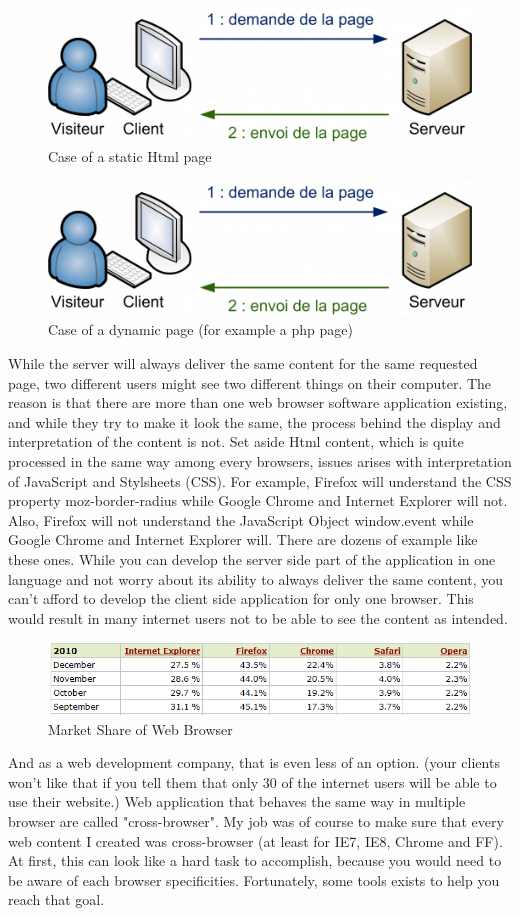 \begin{figure}[!l]
\centering
\includegraphics[width=.55\textwidth]{img/static.png}
\caption{Case of a static Html page}
\label{figure:static page}
\end{figure}
\begin{figure}[!r]
\centering
\includegraphics[width=.55\textwidth]{img/static.png}
\caption{Case of a dynamic page (for example a php page)}
\label{figure:dynamic page}
\end{figure}

While the server will always deliver the same content for the same requested page, two different users might see two different things on their computer. 
The reason is that there are more than one web browser software application existing, and while they try to make it look the same, the process behind the display and interpretation of the content is not. Set aside Html content, which is quite processed in the same way among every browsers, issues arises with interpretation of
JavaScript and Stylsheets (CSS). For example, Firefox will understand the CSS property moz-border-radius while Google Chrome and Internet Explorer will not. Also, Firefox will not understand the JavaScript Object window.event while Google Chrome and Internet Explorer will. There are dozens of example like these ones.
While you can develop the server side part of the application in one language and not worry about its ability to always deliver the same content, you can't afford to develop the client side application for only one browser. This would result in many internet users not to be able to see the content as intended.
\begin{figure}[!ht]
\centering
\includegraphics[width=.55\textwidth]{img/browser_statistics.png}
\caption{Market Share of Web Browser}
\label{figure:Market Share of Web Browser}
\end{figure}
And as a web development company, that is even less of an option. (your clients won't like that if you tell them that only 30 of the internet users will be able to use their website.)
Web application that behaves the same way in multiple browser are called "cross-browser". 
My job was of course to make sure that every web content I created was cross-browser (at least for IE7, IE8, Chrome and FF).
At first, this can look like a hard task to accomplish, because you would need to be aware of each browser specificities. Fortunately, some tools exists to help you reach that goal.

